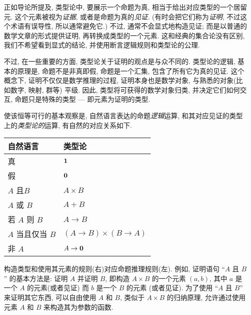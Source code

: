 %
%
正如导论所提及, 类型论中, 要展示一个命题为真, 相当于给出对应类型的一个居留元. %
%
这个元素被视为\emph{证据}, 或者是命题为真的\emph{见证}.
(有时会把它们称为\emph{证明}, 不过这个术语有误导性, 所以通常避免它.)
不过, 通常不会显式地构造见证;
而是以普通的数学文章的形式提供证明, 再转换成类型的一个元素.
这和经典的集合论没有区别, 我们不希望看到显式的结论, 并使用断言逻辑规则和类型论的公理.

不过, 在一些重要的方面, 类型论关于证明的观点是与众不同的.
类型论的逻辑, 基本的原理是, 命题不是非真即假, 命题是一个汇集, 包含了所有它为真的见证.
这个概念下, 证明不仅仅是数学推理的过程, 证明本身也是数学对象, 与熟悉的对象(比如数字, 映射, 群等) 平级.
因此, 类型将可获得的数学对象归类, 并决定它们如何交互, 命题只是特殊的类型 --- 即元素为证明的类型.

%
%
使该恒等可行的基本观察是, 自然语言表达的命题\emph{逻辑}运算, 和其对应见证的类型上的\emph{类型论的}运算, 有自然的对应关系如下.
%
%
%
%
%
\begin{center}
    \medskip
    \begin{tabular}{ll}
        \toprule
        自然语言         & 类型论                          \\
        \midrule
        真            & $\mathbf{1}$                      \\
        假            & $\mathbf{0}$                    \\
        $A$ 且$B$     & $A \times B$                 \\
        $A$ 或 $B$    & $A + B$                      \\
        若 $A$ 则 $B$  & $A \to B$                    \\
        $A$ 当且仅当 $B$ & $(A \to B) \times (B \to A)$ \\
        非 $A$        & $A \to \mathbf{0}$              \\
        \bottomrule
    \end{tabular}
    \medskip
\end{center}

构造类型和使用其元素的规则(右)对应命题推理规则(左).
例如, 证明语句 ``$A$ 且 $B$'' 的基本方法是: 证明 $A$ 并证明 $B$, 即构造 $A\times B$ 的一个元素 $(a,b)$, 其中 $a$ 是一个 $A$ 的元素(或者见证) 而 $b$ 是一个 $B$ 的元素 (或者见证).
为了使用 ``$A$ 且 $B$'' 来证明其它东西, 可以自由使用 $A$ 和 $B$, 类似于 $A\times B$ 的归纳原理, 允许通过使用元素 $A$ 和 $B$ 来构造其为参数的函数.

